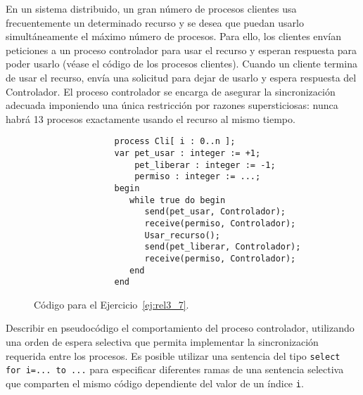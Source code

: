 \begin{ejercicio}\label{ej:rel3_7}
    En un sistema distribuido, un gran número de procesos clientes usa frecuentemente un determinado recurso y se desea que puedan usarlo simultáneamente el máximo número de procesos. Para ello, los clientes envían peticiones a un proceso controlador para usar el recurso y esperan respuesta para poder usarlo (véase el código de los procesos clientes). Cuando un cliente termina de usar el recurso, envía una solicitud para dejar de usarlo y espera respuesta del Controlador. El proceso controlador se encarga de asegurar la sincronización adecuada imponiendo una única restricción por razones supersticiosas: nunca habrá 13 procesos exactamente usando el recurso al mismo tiempo.
    \begin{figure}[H]
        \centering
            \begin{verbatim}
                process Cli[ i : 0..n ];
                var pet_usar : integer := +1;
                    pet_liberar : integer := -1;
                    permiso : integer := ...;
                begin
                   while true do begin
                      send(pet_usar, Controlador);
                      receive(permiso, Controlador);
                      Usar_recurso();
                      send(pet_liberar, Controlador);
                      receive(permiso, Controlador);
                   end
                end
            \end{verbatim}
        \caption{Código para el Ejercicio~\ref{ej:rel3_7}.}
        \label{fig:cod_7}
    \end{figure}
    Describir en pseudocódigo el comportamiento del proceso controlador, utilizando una orden de espera selectiva que permita implementar la sincronización requerida entre los procesos. Es posible utilizar una sentencia del tipo \verb|select for i=... to ...| para especificar diferentes ramas de una sentencia selectiva que comparten el mismo código dependiente del valor de un índice \verb|i|.\\


\end{ejercicio}
